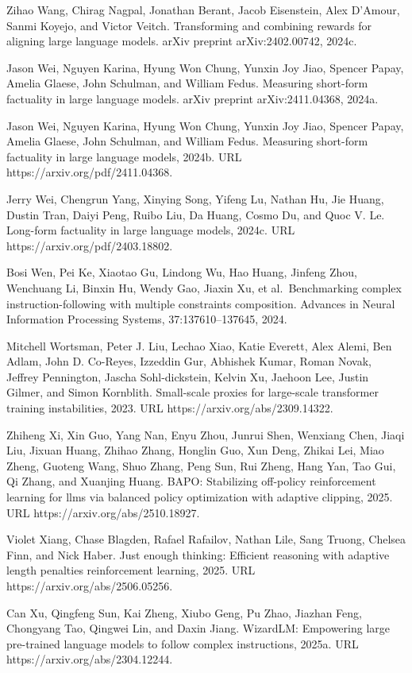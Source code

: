 \documentclass[
  10
]{article}
\begin{document}
Zihao Wang, Chirag Nagpal, Jonathan Berant, Jacob Eisenstein, Alex
D'Amour, Sanmi Koyejo, and Victor Veitch. Transforming and combining
rewards for aligning large language models. arXiv preprint
arXiv:2402.00742, 2024c.

Jason Wei, Nguyen Karina, Hyung Won Chung, Yunxin Joy Jiao, Spencer
Papay, Amelia Glaese, John Schulman, and William Fedus. Measuring
short-form factuality in large language models. arXiv preprint
arXiv:2411.04368, 2024a.

Jason Wei, Nguyen Karina, Hyung Won Chung, Yunxin Joy Jiao, Spencer
Papay, Amelia Glaese, John Schulman, and William Fedus. Measuring
short-form factuality in large language models, 2024b. URL
https://arxiv.org/pdf/2411.04368.

Jerry Wei, Chengrun Yang, Xinying Song, Yifeng Lu, Nathan Hu, Jie Huang,
Dustin Tran, Daiyi Peng, Ruibo Liu, Da Huang, Cosmo Du, and Quoc V. Le.
Long-form factuality in large language models, 2024c. URL
https://arxiv.org/pdf/2403.18802.

Bosi Wen, Pei Ke, Xiaotao Gu, Lindong Wu, Hao Huang, Jinfeng Zhou,
Wenchuang Li, Binxin Hu, Wendy Gao, Jiaxin Xu, et al.~Benchmarking
complex instruction-following with multiple constraints composition.
Advances in Neural Information Processing Systems, 37:137610--137645,
2024.

Mitchell Wortsman, Peter J. Liu, Lechao Xiao, Katie Everett, Alex Alemi,
Ben Adlam, John D. Co-Reyes, Izzeddin Gur, Abhishek Kumar, Roman Novak,
Jeffrey Pennington, Jascha Sohl-dickstein, Kelvin Xu, Jaehoon Lee, Justin
Gilmer, and Simon Kornblith. Small-scale proxies for large-scale
transformer training instabilities, 2023. URL
https://arxiv.org/abs/2309.14322.

Zhiheng Xi, Xin Guo, Yang Nan, Enyu Zhou, Junrui Shen, Wenxiang Chen,
Jiaqi Liu, Jixuan Huang, Zhihao Zhang, Honglin Guo, Xun Deng, Zhikai
Lei, Miao Zheng, Guoteng Wang, Shuo Zhang, Peng Sun, Rui Zheng, Hang
Yan, Tao Gui, Qi Zhang, and Xuanjing Huang. BAPO: Stabilizing off-policy
reinforcement learning for llms via balanced policy optimization with
adaptive clipping, 2025. URL https://arxiv.org/abs/2510.18927.

Violet Xiang, Chase Blagden, Rafael Rafailov, Nathan Lile, Sang Truong,
Chelsea Finn, and Nick Haber. Just enough thinking: Efficient reasoning
with adaptive length penalties reinforcement learning, 2025. URL
https://arxiv.org/abs/2506.05256.

Can Xu, Qingfeng Sun, Kai Zheng, Xiubo Geng, Pu Zhao, Jiazhan Feng,
Chongyang Tao, Qingwei Lin, and Daxin Jiang. WizardLM: Empowering large
pre-trained language models to follow complex instructions, 2025a. URL
https://arxiv.org/abs/2304.12244.
\end{document}
